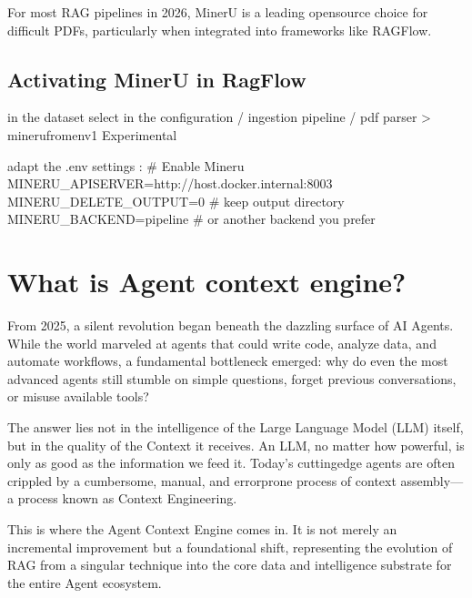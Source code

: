\documentclass[letterpaper,10pt,english]{sphinxmanual}
\begin{document}
\sphinxAtStartPar
For most RAG pipelines in 2026, MinerU is a leading open\sphinxhyphen{}source choice
for difficult PDFs, particularly when integrated into frameworks like
RAGFlow.


\section{Activating MinerU in RagFlow}
\label{\detokenize{minerU:activating-mineru-in-ragflow}}
\sphinxAtStartPar
in the dataset select in the configuration / ingestion pipeline / pdf parser \sphinxhyphen{}\textgreater{} mineru\sphinxhyphen{}from\sphinxhyphen{}env\sphinxhyphen{}1 Experimental

\sphinxAtStartPar
adapt the .env settings :
\# Enable Mineru
MINERU\_APISERVER=http://host.docker.internal:8003
MINERU\_DELETE\_OUTPUT=0   \# keep output directory
MINERU\_BACKEND=pipeline  \# or another backend you prefer

\sphinxstepscope


\chapter{What is Agent context engine?}
\label{\detokenize{agent-context-engine:what-is-agent-context-engine}}\label{\detokenize{agent-context-engine::doc}}
\sphinxAtStartPar
From 2025, a silent revolution began beneath the dazzling surface of AI Agents. While the world marveled at agents that could write code, analyze data, and automate workflows, a fundamental bottleneck emerged: why do even the most advanced agents still stumble on simple questions, forget previous conversations, or misuse available tools?

\sphinxAtStartPar
The answer lies not in the intelligence of the Large Language Model (LLM) itself, but in the quality of the Context it receives. An LLM, no matter how powerful, is only as good as the information we feed it. Today’s cutting\sphinxhyphen{}edge agents are often crippled by a cumbersome, manual, and error\sphinxhyphen{}prone process of context assembly—a process known as Context Engineering.

\sphinxAtStartPar
This is where the Agent Context Engine comes in. It is not merely an incremental improvement but a foundational shift, representing the evolution of RAG from a singular technique into the core data and intelligence substrate for the entire Agent ecosystem.
\end{document}
